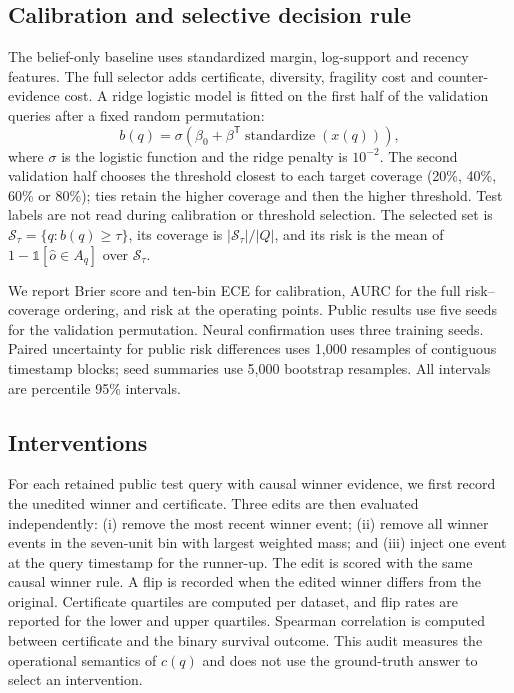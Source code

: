 \documentclass[preprint,12pt]{elsarticle}
\begin{document}
\subsection{Calibration and selective decision rule}
The belief-only baseline uses standardized margin, log-support and recency features. The full selector adds certificate, diversity, fragility cost and counter-evidence cost. A ridge logistic model is fitted on the first half of the validation queries after a fixed random permutation:
\begin{equation}
 b(q)=\sigma\left(\beta_0+\beta^{\mathsf T}\operatorname{standardize}(x(q))\right),
\end{equation}
where $\sigma$ is the logistic function and the ridge penalty is $10^{-2}$. The second validation half chooses the threshold closest to each target coverage (20\%, 40\%, 60\% or 80\%); ties retain the higher coverage and then the higher threshold. Test labels are not read during calibration or threshold selection. The selected set is $\mathcal{S}_\tau=\{q:b(q)\geq\tau\}$, its coverage is $|\mathcal{S}_\tau|/|Q|$, and its risk is the mean of $1-\mathbb{1}[\hat{o}\in A_q]$ over $\mathcal{S}_\tau$.

We report Brier score and ten-bin ECE for calibration, AURC for the full risk--coverage ordering, and risk at the operating points. Public results use five seeds for the validation permutation. Neural confirmation uses three training seeds. Paired uncertainty for public risk differences uses 1,000 resamples of contiguous timestamp blocks; seed summaries use 5,000 bootstrap resamples. All intervals are percentile 95\% intervals.

\subsection{Interventions}
For each retained public test query with causal winner evidence, we first record the unedited winner and certificate. Three edits are then evaluated independently: (i) remove the most recent winner event; (ii) remove all winner events in the seven-unit bin with largest weighted mass; and (iii) inject one event at the query timestamp for the runner-up. The edit is scored with the same causal winner rule. A flip is recorded when the edited winner differs from the original. Certificate quartiles are computed per dataset, and flip rates are reported for the lower and upper quartiles. Spearman correlation is computed between certificate and the binary survival outcome. This audit measures the operational semantics of $c(q)$ and does not use the ground-truth answer to select an intervention.
\end{document}

